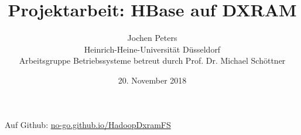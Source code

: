 \documentclass[a4paper,11pt]{article}
\title{Projektarbeit: HBase auf DXRAM}
\author{Jochen Peters\\ Heinrich-Heine-Universität Düsseldorf\\ Arbeitsgruppe Betriebssysteme betreut durch Prof. Dr. Michael Schöttner}
\date{20. November 2018}
\begin{document}
\maketitle
Auf Github: \href{https://no-go.github.io/HadoopDxramFS/}{no-go.github.io/HadoopDxramFS}



\end{document}

